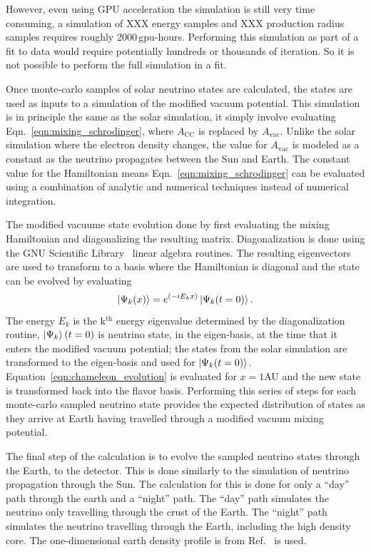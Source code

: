 However, even using GPU acceleration the simulation is still very time consuming,
a simulation of XXX energy samples and XXX production radius samples requires
roughly 2000\,gpu-hours. Performing this simulation as part of a fit to data would
require potentially hundreds or thousands of iteration. So it is not possible to
perform the full simulation in a fit.

Once  monte-carlo samples of solar neutrino states are calculated, the
states are used as inputs to a simulation of the modified vacuum potential.
This simulation is in principle the same as the solar simulation,
it simply involve evaluating Eqn.~\eqref{eqn:mixing_schrodinger}, where 
$A_{\mathrm{CC}}$ is replaced by $A_{\mathrm{vac}}$.
Unlike the solar simulation where the electron density changes,
the value for $A_{\mathrm{vac}}$ is modeled as a constant 
as the neutrino propagates between the Sun and Earth.
The constant value for the Hamiltonian means
Eqn.~\eqref{eqn:mixing_schrodinger} can be evaluated using
a combination of analytic and numerical techniques instead of numerical
integration.

The modified vacuume state evolution done by first evaluating the mixing
Hamiltonian and diagonalizing the resulting matrix.
Diagonalization is done using the GNU Scientific Library~\cite{gsl_ref}
linear algebra routines.
The resulting eigenvectors are used to transform to a basis where the
Hamiltonian is diagonal and the state can be evolved by evaluating
\begin{equation}
\ket{\Psi_{k}(x)} = e^{(-iE_{k}x)} \ket{\Psi_{k}(t=0)}\text{.}
\label{eqn:chameleon_evolution}
\end{equation}
The energy $E_{k}$ is the k$^{\mathrm{th}}$ energy eigenvalue determined by the
diagonalization routine, $\ket{\Psi_{k}}(t=0)$ is neutrino state, in the eigen-basis, at
the time that it enters the modified vacuum potential;
the states from the solar simulation are transformed to the eigen-basis
and used for $\ket{\Psi_{k}(t=0)}$.
Equation~\eqref{eqn:chameleon_evolution} is evaluated for $x=1$AU
and the new state is transformed back into the flavor basis.
Performing this series of steps for each monte-carlo sampled neutrino
state provides the expected distribution of states as they arrive at Earth
having travelled through a modified vacuum mixing potential.

The final step of the calculation is to evolve the sampled neutrino states through
the Earth, to the detector.
This is done similarly to the simulation of neutrino propagation through the
Sun.
The calculation for this is done for only a ``day'' path through the earth
and a ``night'' path. The ``day'' path simulates the neutrino only travelling
through the crust of the Earth. The ``night'' path simulates the neutrino
travelling through the Earth, including the high density core.
The one-dimensional earth density profile is from Ref.~\citep{PREM} is used.

